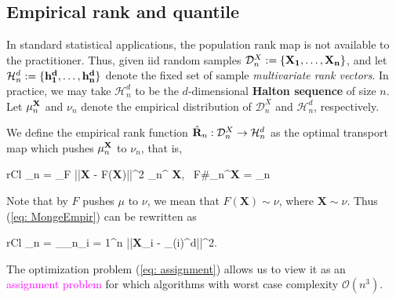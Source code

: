 \subsection{Empirical rank and quantile}
In standard statistical applications, the population rank map is not available to the practitioner. Thus, given iid random samples $\mathcal{D}_n^X :=\{\bf{X}_1, \dots, \bf{X}_n\}$, and let $ \mathcal{H}_n^d:=\{\bf{h}_1^d, \dots, \bf{h}_n^d\}$ denote the fixed set of sample \textit{multivariate rank vectors}. In practice, we may take $\mathcal{H}_n^d$ to be the $d$-dimensional {\bf Halton sequence} of size $n$. Let $\mu_n^{\bf{X}}$ and $\nu_n$ denote the empirical distribution of $\mathcal{D}_n^X$ and $\mathcal{H}_n^d$, respectively. 

\begin{definition}
	We define the empirical rank function $\hat{\bf R}_n: \mathcal{D}_n^X \to \mathcal{H}_n^d$ as the optimal transport map which pushes $\mu_n^{\bf X}$ to $\nu_n$, that is, 
	\begin{IEEEeqnarray}{rCl}
		_n = \arg\inf\limits_{F} \int ||{\bf X} - F({\bf X})||^2 {\mu}_n^{ \bf X}, \quad {} \ F\#\mu_n^{\bf X} = \nu_n \label{eq: MongeEmpir}
	\end{IEEEeqnarray}
\end{definition}
\begin{remark}
	Note that by $F$ pushes $\mu$ to $\nu$, we mean that $F(\mathbf{X}) \sim \nu$, where $\mathbf{X} \sim \nu$. Thus (\ref{eq: MongeEmpir}) can be rewritten as 
	\begin{IEEEeqnarray}{rCl}
		\hat{\bf \sigma}_n = \arg\inf\limits_{\sigma \in {}_n}\sum_{i = 1}^n ||{\bf X}_i - _{\sigma(i)}^d||^2. \label{eq: assignment}
	\end{IEEEeqnarray}
The optimization problem (\ref{eq: assignment}) allows us to view it as an \textcolor{magenta}{assignment problem} for which algorithms with worst case complexity $\mathcal{O}(n^3)$.
\end{remark}


